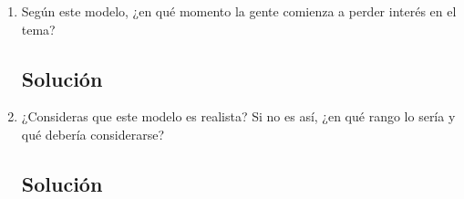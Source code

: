 \begin{enumerate}[label=\arabic*., leftmargin=*]
\begin{enumerate}[label=(\alph*), leftmargin=*]
        \item Según este modelo, ¿en qué momento la gente comienza a perder interés en el tema?
        \subsection*{Solución}

        \item ¿Consideras que este modelo es realista? Si no es así, ¿en qué rango lo sería y qué debería considerarse?
        \subsection*{Solución}
    \end{enumerate}
\end{enumerate}